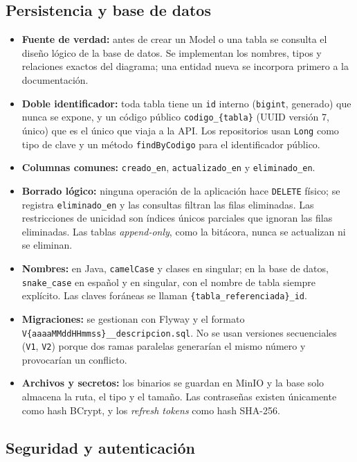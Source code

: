 \subsection{Persistencia y base de datos}

\begin{itemize}
    \item \textbf{Fuente de verdad:} antes de crear un Model o una tabla se consulta el diseño lógico de la base de datos. Se implementan los nombres, tipos y relaciones exactos del diagrama; una entidad nueva se incorpora primero a la documentación.
    \item \textbf{Doble identificador:} toda tabla tiene un \texttt{id} interno (\texttt{bigint}, generado) que nunca se expone, y un código público \texttt{codigo\_\{tabla\}} (UUID versión 7, único) que es el único que viaja a la API. Los repositorios usan \texttt{Long} como tipo de clave y un método \texttt{findByCodigo} para el identificador público.
    \item \textbf{Columnas comunes:} \texttt{creado\_en}, \texttt{actualizado\_en} y \texttt{eliminado\_en}.
    \item \textbf{Borrado lógico:} ninguna operación de la aplicación hace \texttt{DELETE} físico; se registra \texttt{eliminado\_en} y las consultas filtran las filas eliminadas. Las restricciones de unicidad son índices únicos parciales que ignoran las filas eliminadas. Las tablas \textit{append-only}, como la bitácora, nunca se actualizan ni se eliminan.
    \item \textbf{Nombres:} en Java, \texttt{camelCase} y clases en singular; en la base de datos, \texttt{snake\_case} en español y en singular, con el nombre de tabla siempre explícito. Las claves foráneas se llaman \texttt{\{tabla\_referenciada\}\_id}.
    \item \textbf{Migraciones:} se gestionan con Flyway y el formato \texttt{V\{aaaaMMddHHmmss\}\_\_descripcion.sql}. No se usan versiones secuenciales (\texttt{V1}, \texttt{V2}) porque dos ramas paralelas generarían el mismo número y provocarían un conflicto.
    \item \textbf{Archivos y secretos:} los binarios se guardan en MinIO y la base solo almacena la ruta, el tipo y el tamaño. Las contraseñas existen únicamente como hash BCrypt, y los \textit{refresh tokens} como hash SHA-256.
\end{itemize}

\subsection{Seguridad y autenticación}

